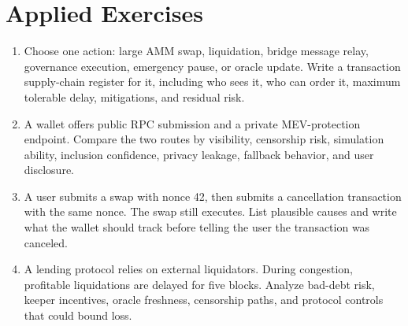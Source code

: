 \section*{Applied Exercises}

\begin{enumerate}
\item Choose one action: large AMM swap, liquidation, bridge message relay, governance execution, emergency pause, or oracle update. Write a transaction supply-chain register for it, including who sees it, who can order it, maximum tolerable delay, mitigations, and residual risk.

\item A wallet offers public RPC submission and a private MEV-protection endpoint. Compare the two routes by visibility, censorship risk, simulation ability, inclusion confidence, privacy leakage, fallback behavior, and user disclosure.

\item A user submits a swap with nonce 42, then submits a cancellation transaction with the same nonce. The swap still executes. List plausible causes and write what the wallet should track before telling the user the transaction was canceled.

\item A lending protocol relies on external liquidators. During congestion, profitable liquidations are delayed for five blocks. Analyze bad-debt risk, keeper incentives, oracle freshness, censorship paths, and protocol controls that could bound loss.
\end{enumerate}
